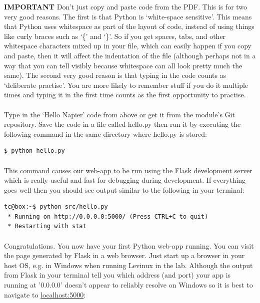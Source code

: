 \documentclass[12pt, a4paper, twoside]{book}
\begin{document}
\begin{framed}
\textbf{IMPORTANT} Don't just copy and paste code from the PDF. This is for two very good reasons. The first is that Python is `white-space sensitive'. This means that Python uses whitespace as part of the layout of code, instead of using things like curly braces such as `\{' and `\}'. So if you get spaces, tabs, and other whitespace characters mixed up in your file, which can easily happen if you copy and paste, then it will affect the indentation of the file (although perhaps not in a way that you can tell visibly because whitespace can all look pretty much the same). The second very good reason is that typing in the code counts as `deliberate practise'. You are more likely to remember stuff if you do it multiple times and typing it in the first time counts as the first opportunity to practise.
\end{framed}

\paragraph{} Type in the `Hello Napier' code from above or get it from the module's Git repository. Save the code in a file called hello.py then run it by executing the following command in the same directory where hello.py is stored:

\begin{lstlisting}[style=DOS]
    $ python hello.py
\end{lstlisting}

\paragraph{} This command causes our web-app to be run using the Flask development server which is really useful and fast for debugging during development. If everything goes well then you should see output similar to the following in your terminal:

\begin{lstlisting}[style=DOS]
tc@box:~$ python src/hello.py 
 * Running on http://0.0.0.0:5000/ (Press CTRL+C to quit)
 * Restarting with stat
\end{lstlisting}

\paragraph{} Congratulations. You now have your first Python web-app running. You can visit the page generated by Flask in a web browser. Just start up a browser in your host OS, e.g. in Windows when running Levinux in the lab. Although the output from Flask in your terminal tell you which address (and port) your app is running at '0.0.0.0' doesn't appear to reliably resolve on Windows so it is best to navigate to \url{localhost:5000}:
\end{document}
